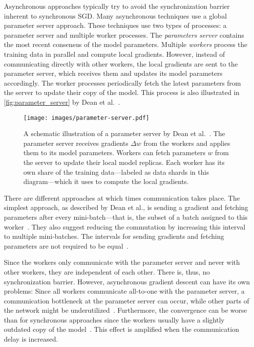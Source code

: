 \documentclass[conference]{IEEEtran}
\begin{document}
Asynchronous approaches typically try to avoid the synchronization barrier inherent to synchronous SGD.
%
Many asynchronous techniques use a global parameter server approach.
These techniques use two types of processes: a parameter server and multiple worker processes.
The \emph{parameters server} contains the most recent consensus of the model parameters.
Multiple \emph{workers} process the training data in parallel and compute local gradients.
However, instead of communicating directly with other workers, the local gradients are sent to the parameter server, which receives them and updates its model parameters accordingly.
The worker processes periodically fetch the latest parameters from the server to update their copy of the model.
This process is also illustrated in \autoref{fig:parameter_server} by Dean et al.~\cite{dean2012-Large-scale-distributed}.

\begin{figure}[ht]
\centering
\texttt{[image: images/parameter-server.pdf]}
\caption{
A schematic illustration of a parameter server by Dean et al.~\cite{dean2012-Large-scale-distributed}.
The parameter server receives gradients $\Delta w$ from the workers and applies them to its model parameters.
Workers can fetch parameters $w$ from the server to update their local model replicas.
Each worker has its own share of the training data---labeled as data shards in this diagram---which it uses to compute the local gradients.
}
\label{fig:parameter_server}
\end{figure}

There are different approaches at which times communication takes place.
The simplest approach, as described by Dean et al., is sending a gradient and fetching parameters after every mini-batch---that is, the subset of a batch assigned to this worker~\cite{dean2012-Large-scale-distributed}.
They also suggest reducing the commutation by increasing this interval to multiple mini-batches.
The intervals for sending gradients and fetching parameters are not required to be equal~\cite{dean2012-Large-scale-distributed}.

Since the workers only communicate with the parameter server and never with other workers, they are independent of each other.
There is, thus, no synchronization barrier.
However, asynchronous gradient descent can have its own problems:
Since all workers communicate all-to-one with the parameter server, a communication bottleneck at the parameter server can occur, while other parts of the network might be underutilized~\cite{jin2016-How-to-scale}.
Furthermore, the convergence can be worse than for synchronous approaches since the workers usually have a slightly outdated copy of the model~\cite{jin2016-How-to-scale,chen2016-Revisiting-distributed-synchronous-SGD}.
This effect is amplified when the communication delay is increased.
\end{document}
